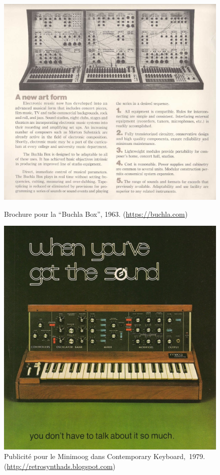 \begin{figure}[!htbp]
	\captionsetup{format=plain}%
	\centering
	\begin{minipage}[t]{0.48\textwidth}
		\includegraphics[width=\linewidth]{gfx/05_interfaces/Buchla-ad.jpg}
		\caption[Brochure pour la Buchla Box]{Brochure pour la ``Buchla Box'', 1963. (\url{https://buchla.com})}
		\label{fig:interface:buchla-100}
	\end{minipage}
	\hspace{.02\linewidth}
	\begin{minipage}[t]{0.48\textwidth}
	    \includegraphics[width=\linewidth]{gfx/05_interfaces/Minimoog-ad.jpg}
		\caption[Publicité pour le Minimoog]{Publicité pour le Minimoog dans Contemporary Keyboard,~1979. (\url{http://retrosynthads.blogspot.com})}
		\label{fig:interface:minimoog}
	\end{minipage}
\end{figure}
